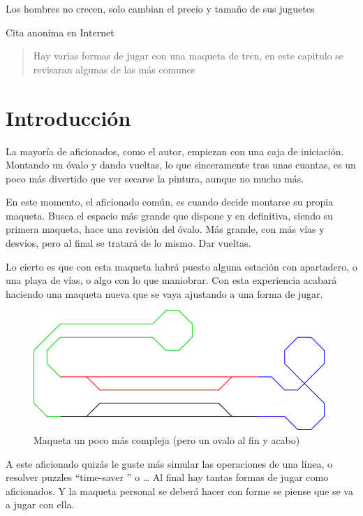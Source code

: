 

\epigraph{Los hombres no crecen, solo cambian el precio y tamaño de sus juguetes}{Cita anonima en Internet}

\begin{abstract}
Hay varias formas de jugar con una maqueta de tren, en este capitulo se revisaran algunas de las más comunes
\end{abstract}

\section{Introducción}
La mayoría de aficionados, como el autor, empiezan con una caja de iniciación. Montando un óvalo y dando vueltas, lo que sinceramente tras unas cuantas, es un poco más divertido que ver secarse la pintura, aunque no mucho más.

En este momento, el aficionado común, es cuando decide montarse su propia maqueta. Busca el espacio más grande que dispone y en definitiva, siendo su primera maqueta, hace una revisión del óvalo. Más grande, con más vías y desvíos, pero al final se tratará de lo mismo. Dar vueltas.

Lo cierto es que con esta maqueta habrá puesto alguna estación con apartadero, o una playa de vías, o algo con lo que maniobrar. Con esta experiencia acabará haciendo una maqueta nueva que se vaya ajustando a una forma de jugar.

\begin{figure}[h]
	\centering\includegraphics[]{chapters/01_jugar/maqueta.png}
	\caption{Maqueta un poco más compleja (pero un ovalo al fin y acabo)}
	\label{fig:maqueta}
\end{figure}

A este aficionado quizás le guste más simular las operaciones de una línea, o resolver puzzles “time-saver ” o … Al final hay tantas formas de jugar como aficionados. Y la maqueta personal se deberá hacer con forme se piense que se va a jugar con ella.

